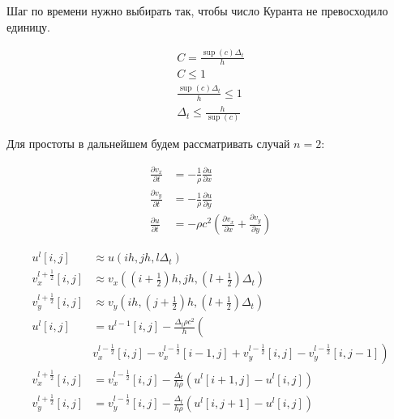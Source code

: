 Шаг по времени нужно выбирать так, чтобы число Куранта не превосходило единицу.

\begin{align*}
    C = \frac{\sup \left( c \right) \Delta_t}{h} \\
    C \le 1 \\
    \frac{\sup \left( c \right) \Delta_t}{h} \le 1 \\
    \Delta_t \le \frac{h}{\sup \left( c \right)}
\end{align*}

Для простоты в дальнейшем будем рассматривать случай \( n = 2 \):

\begin{align*}
    \frac{\partial v_x}{\partial t}
    &= - \frac{1}{\rho} \frac{\partial u}{\partial x}
    \\
    \frac{\partial v_y}{\partial t}
    &= - \frac{1}{\rho} \frac{\partial u}{\partial y}
    \\
    \frac{\partial u}{\partial t}
    &=
    -
    \rho
    c^2
    \left(
    \frac{\partial v_x}{\partial x} + \frac{\partial v_y}{\partial y}
    \right)
\end{align*}

\begin{align*}
    u^l \left[ i, j \right] & \approx u \left( ih, jh, l \Delta_t \right) \\
    v_x^{l + \frac{1}{2}} \left[ i, j \right]
    & \approx
    v_x
    \left(
    \left( i + \frac{1}{2} \right) h,
    jh,
    \left( l + \frac{1}{2} \right) \Delta_t
    \right)
    \\
    v_y^{l + \frac{1}{2}} \left[ i, j \right]
    & \approx
    v_y
    \left(
    ih,
    \left( j + \frac{1}{2} \right) h,
    \left( l + \frac{1}{2} \right) \Delta_t
    \right)
    \\
    u^l \left[ i, j \right]
    &= 
    u^{l-1} \left[ i, j \right]
    -
    \frac{\Delta_t \rho c^2}{h}
    \left( \right.
    \\
    &v_x^{l - \frac{1}{2}} \left[ i, j \right]
    - v_x^{l - \frac{1}{2}} \left[ i - 1, j \right]
    + v_y^{l - \frac{1}{2}} \left[ i, j \right]
    - v_y^{l - \frac{1}{2}} \left[ i, j - 1 \right]
    \left. \right)
    \\
    v_x^{l + \frac{1}{2}} \left[ i, j \right]
    &=
    v_x^{l - \frac{1}{2}} \left[ i, j \right]
    -
    \frac{\Delta_t}{h \rho}
    \left( u^l \left[ i + 1, j \right] - u^l \left[ i, j \right] \right) \\
    v_y^{l + \frac{1}{2}} \left[ i, j \right]
    &=
    v_y^{l - \frac{1}{2}} \left[ i, j \right]
    -
    \frac{\Delta_t}{h \rho}
    \left( u^l \left[ i, j + 1 \right] - u^l \left[ i, j \right] \right) \\
\end{align*}

